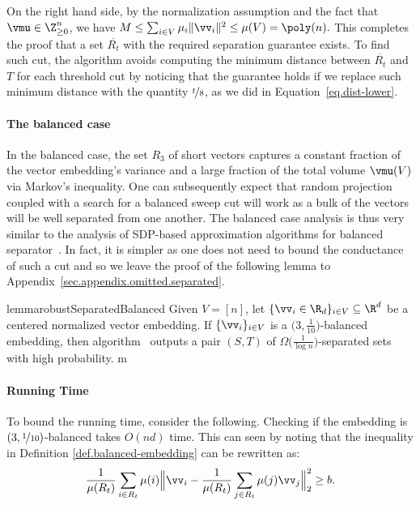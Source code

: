 \documentclass[letterpaper]{article}
\begin{document}
On the right hand side, by the normalization assumption and the fact that $\vmu \in \Z^n_{\geq 0}$, we have $
M \leq \sum_{i \in V} \mu_i \|\vv_i\|^2 \leq \mu(V) = \poly(n).
$
 This completes the proof that a set $\overline{R_t}$ with the required separation guarantee exists. To find such cut, the \roundcut algorithm avoids computing the minimum distance between $\overline{R_t}$ and $T$ for each threshold cut by noticing that the guarantee holds if we replace such minimum distance with the quantity $\nicefrac{t}{8}$, as we did in Equation~\ref{eq.dist-lower}.

\paragraph{The balanced case}
In the balanced case, the set $R_3$ of short vectors captures a constant fraction of the vector embedding's variance and a large fraction of the total volume $\vmu(V)$ via Markov's inequality. One can subsequently expect that random projection coupled with a search for a balanced sweep cut will work as a bulk of the vectors will be well separated from one another. The balanced case analysis is thus very similar to the analysis of SDP-based approximation algorithms for balanced separator~\cite{orecchia2012balanced_separator}. In fact, it is simpler as one does not need to bound the conductance of such a cut and so we leave the proof of the following lemma to Appendix~\ref{sec.appendix.omitted.separated}.

\begin{restatable}{lemma}{robustSeparatedBalanced}
\label{lem.robust-separated.balanced}
Given $V = [n]$, let $\{ \vv_i \in \R_d \}_{i \in V} \subseteq \R^d$ be a centered normalized vector embedding. If $\{ \vv_i \}_{i \in V}$ is a $\big( 3, \frac{1}{10} \big)$-balanced embedding, then algorithm \roundcut~outputs a pair $(S,T)$ of $ \Omega\big( \frac{1}{\log n} \big)$-separated sets with high probability.
m\end{restatable}


\paragraph{Running Time} To bound the running time, consider the following. Checking if the embedding is $(3,\nicefrac{1}{10})$-balanced takes $O(nd)$ time. This can seen by noting that the inequality in Definition \ref{def.balanced-embedding} can be rewritten as:
\[
    {1\over \mu(R_t)}\sum_{i\in R_t} \mu(i) \Big\|\vv_i - {1\over \mu(R_t)}\sum_{j\in R_t} \mu(j)\vv_j\Big\|_2^2 \geq b.
\]
\end{document}
